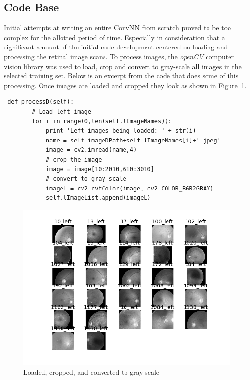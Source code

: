 \documentclass[letterpaper,12pt]{article}
\newcommand{\figref}[1]{Figure~\ref{#1}}
\begin{document}
\subsection{Code Base}


Initial attempts at writing an entire ConvNN from scratch proved to be too complex for the allotted period of time. Especially in consideration that a significant amount of the initial code development centered on loading and processing the retinal image scans. To process images, the \textit{openCV} computer vision library was used to load, crop and convert to gray-scale all images in the selected training set. Below is an excerpt from the code that does some of this processing. Once images are loaded and cropped they look as shown in \figref{loaded}.

\begin{verbatim}
 def processD(self):
        # Load left image
        for i in range(0,len(self.lImageNames)):
            print 'Left images being loaded: ' + str(i)
            name = self.imageDPath+self.lImageNames[i]+'.jpeg'
            image = cv2.imread(name,4)
            # crop the image
            image = image[10:2010,610:3010]
            # convert to gray scale
            imageL = cv2.cvtColor(image, cv2.COLOR_BGR2GRAY)
            self.lImageList.append(imageL)
\end{verbatim}

\begin{figure}[htbp]
\begin{center}
\includegraphics[scale=0.75]{images/lInitialImages_gray.png}
\caption{Loaded, cropped, and converted to gray-scale}
\label{loaded}
\end{center}
\end{figure}
\end{document}
